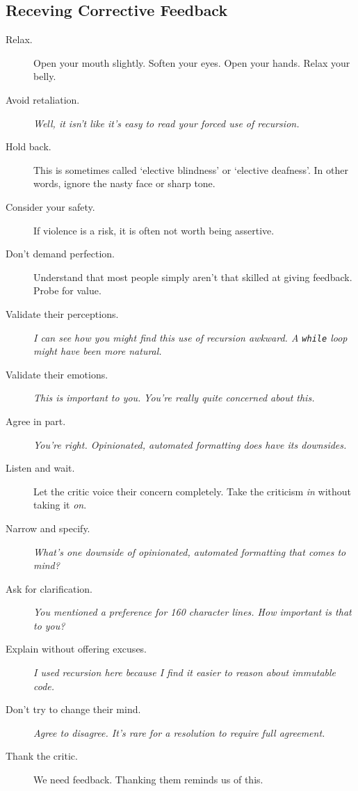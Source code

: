 \documentclass{article}
\begin{document}
\begin{multicols}{3}
	\section*{Receving Corrective Feedback}

        \begin{description}
            \item[Relax.] Open your mouth slightly. Soften your eyes. Open your hands. Relax your belly.
            \item[Avoid retaliation.] \emph {Well, it isn't like it's easy to read your forced use of recursion.}
            \item[Hold back.] This is sometimes called `elective blindness' or `elective deafness'. In other words, ignore the nasty face or sharp tone.
            \item[Consider your safety.] If violence is a risk, it is often not worth being assertive.
            \item[Don't demand perfection.] Understand that most people simply aren't that skilled at giving feedback. Probe for value.
            \item[Validate their perceptions.] \emph{I can see how you might find this use of recursion awkward. A \texttt{while} loop might have been more natural.}
            \item[Validate their emotions.] \emph{This is important to you.} \emph{You're really quite concerned about this.}
            \item[Agree in part.] \emph{You're right. Opinionated, automated formatting does have its downsides.}
            \item[Listen and wait.] Let the critic voice their concern completely. Take the criticism \emph{in} without taking it \emph{on}.
            \item[Narrow and specify.] \emph{What's one downside of opinionated, automated formatting that comes to mind?}
            \item[Ask for clarification.] \emph{You mentioned a preference for 160 character lines. How important is that to you?}
            \item[Explain without offering excuses.] \emph{I used recursion here because I find it easier to reason about immutable code.}
            \item[Don't try to change their mind.] \emph{Agree to disagree. It's rare for a resolution to require full agreement.}
            \item[Thank the critic.] We need feedback. Thanking them reminds us of this.

\end{description}
\end{multicols}
\end{document}
